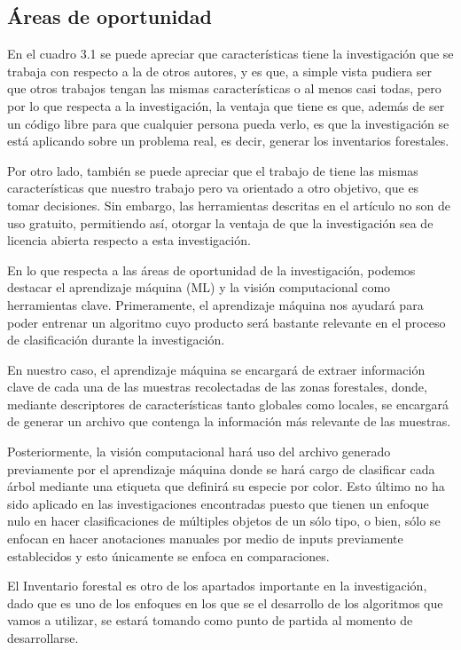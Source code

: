 \subsection{Áreas de oportunidad}
En el cuadro 3.1 se puede apreciar que características tiene la investigación que se trabaja con respecto a la de otros autores, y es que, a simple vista pudiera ser que otros trabajos tengan las mismas características o al menos casi todas, pero por lo que respecta a la investigación, la ventaja que tiene es que, además de ser un código libre para que cualquier persona pueda verlo, es que la investigación se está aplicando sobre un problema real, es decir, generar los inventarios forestales. 

\newpage
Por otro lado, también se puede apreciar que el trabajo de \cite{rf10} tiene las mismas características que nuestro trabajo pero va orientado a otro objetivo, que es tomar decisiones. Sin embargo, las herramientas descritas en el artículo no son de uso gratuito, permitiendo así, otorgar la ventaja de que la investigación sea de licencia abierta respecto a esta investigación.

En lo que respecta a las áreas de oportunidad de la investigación, podemos destacar el aprendizaje máquina (ML) y la visión computacional como herramientas clave. Primeramente, el aprendizaje máquina nos ayudará para poder entrenar un algoritmo cuyo producto será bastante relevante en el proceso de clasificación durante la investigación.

En nuestro caso, el aprendizaje máquina se encargará de extraer información clave de cada una de las muestras recolectadas de las zonas forestales, donde, mediante descriptores de características tanto globales como locales, se encargará de generar un archivo que contenga la información más relevante de las muestras.

Posteriormente, la visión computacional hará uso del archivo generado previamente por el aprendizaje máquina donde se hará cargo de clasificar cada árbol mediante una etiqueta que definirá su especie por color. Esto último no ha sido aplicado en las investigaciones encontradas puesto que tienen un enfoque nulo en hacer clasificaciones de múltiples objetos de un sólo tipo, o bien, sólo se enfocan en hacer anotaciones manuales por medio de inputs previamente establecidos y esto únicamente se enfoca en comparaciones.

El Inventario forestal es otro de los apartados importante en la investigación, dado que es uno de los enfoques en los que se el desarrollo de los algoritmos que vamos a utilizar, se estará tomando como punto de partida al momento de desarrollarse. 

